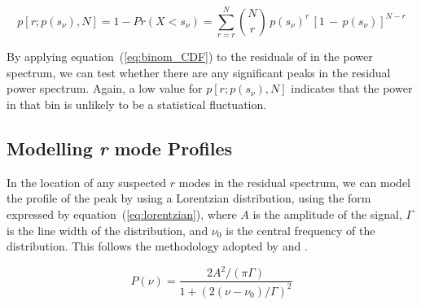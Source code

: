 \begin{equation}
p[r; p(s_\nu), N] = 1 - Pr(X < s_{\nu}) = \sum_{r=r}^{N} \binom{N}{r} \, p(s_{\nu})^r \, [1 \, - \, p(s_{\nu})]^{N-r}
\label{eq:binom_CDF}
\end{equation}

By applying equation~(\ref{eq:binom_CDF}) to the residuals of in the power spectrum, we can test whether there are any significant peaks in the residual power spectrum. Again, a low value for $p[r; p(s_\nu), N]$ indicates that the power in that bin is unlikely to be a statistical fluctuation.


%
%



\subsection{Modelling {\it r} mode Profiles}
In the location of any suspected $r$ modes in the residual spectrum, we can model the profile of the peak by using a Lorentzian distribution, using the form expressed by equation~(\ref{eq:lorentzian}), where $A$ is the amplitude of the signal, $\Gamma$ is the line width of the distribution, and $\nu_0$ is the central frequency of the distribution. This follows the methodology adopted by \citet{loptien_global-scale_2018} and \citet{liang_time-distance_2019}.

\begin{equation}
P(\nu) = \frac{2A^2/(\pi \Gamma)}{1 + (2(\nu - \nu_0)/\Gamma)^2}
\label{eq:lorentzian}
\end{equation}

